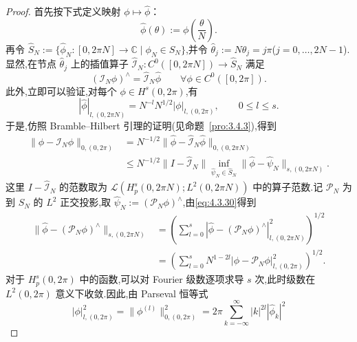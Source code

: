\begin{proof}
首先按下式定义映射 \(\phi\mapsto\widehat\phi\)：
\[
  \widehat\phi(\theta):=\phi\left(\frac{\theta}{N}\right).
\]
再令 \(\widehat S_N:=\{\widehat\phi_N\colon[0,2\pi N]\to\mathbb C\mid\phi_N\in S_N\}\),并令 \(\widehat\theta_j:=N\theta_j=j\pi\)(\(j=0,\ldots,2N-1\)).显然,在节点 \(\widehat\theta_j\) 上的插值算子 \(\widehat{\mathcal I}_N\colon C^0([0,2\pi N])\to\widehat S_N\) 满足
\begin{equation}\label{eq:4.3.29}
  (\mathcal I_N\phi)^\wedge=\widehat{\mathcal I}_N\widehat\phi
  \qquad\forall\phi\in C^0([0,2\pi]).
\end{equation}
此外,立即可以验证,对每个 \(\phi\in H^s(0,2\pi)\),有
\begin{equation}\label{eq:4.3.30}
  |\widehat\phi|_{l,(0,2\pi N)}
   =N^{-l}N^{1/2}|\phi|_{l,(0,2\pi)},\qquad 0\le l\le s.
\end{equation}
于是,仿照 Bramble--Hilbert 引理的证明(见命题~\ref{pro:3.4.3}),得到
\begin{equation}\label{eq:4.3.31}
  \begin{aligned}
    \|\phi-\mathcal I_N\phi\|_{0,(0,2\pi)}
    &=N^{-1/2}\|\widehat\phi-\widehat{\mathcal I}_N\widehat\phi\|_{0,(0,2\pi N)}\\
    &\le N^{-1/2}\|I-\widehat{\mathcal I}_N\|
       \inf_{\widehat\psi_N\in\widehat S_N}\|\widehat\phi-\widehat\psi_N\|_{s,(0,2\pi N)}.
  \end{aligned}
\end{equation}
这里 \(I-\widehat{\mathcal I}_N\) 的范数取为 \(\mathcal L(H_p^s(0,2\pi N);L^2(0,2\pi N))\) 中的算子范数.记 \(\mathcal P_N\) 为到 \(S_N\) 的 \(L^2\) 正交投影,取 \(\widehat\psi_N:=(\mathcal P_N\phi)^\wedge\),由\eqref{eq:4.3.30}得到
\begin{equation}\label{eq:4.3.32}
  \begin{aligned}
    \|\widehat\phi-(\mathcal P_N\phi)^\wedge\|_{s,(0,2\pi N)}
     &=\left(\sum_{l=0}^s|\widehat\phi-(\mathcal P_N\phi)^\wedge|_{l,(0,2\pi N)}^2\right)^{1/2}\\
     &=\left(\sum_{l=0}^s N^{1-2l}|\phi-\mathcal P_N\phi|_{l,(0,2\pi)}^2\right)^{1/2}.
  \end{aligned}
\end{equation}
对于 \(H_p^s(0,2\pi)\) 中的函数,可以对 Fourier 级数逐项求导 \(s\) 次,此时级数在 \(L^2(0,2\pi)\) 意义下收敛.因此,由 Parseval 恒等式
\begin{equation}\label{eq:4.3.33}
  |\phi|_{l,(0,2\pi)}^2
  =\|\phi^{(l)}\|_{0,(0,2\pi)}^2
  =2\pi\sum_{k=-\infty}^\infty |k|^{2l}|\widehat\phi_k|^2

\end{equation}
\end{proof}
